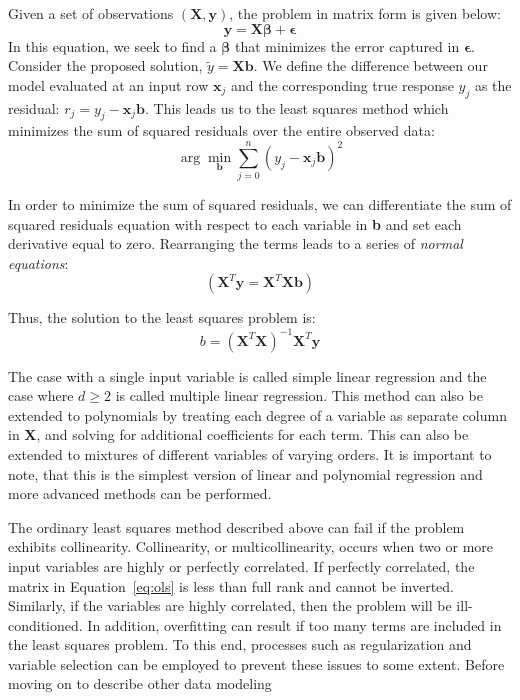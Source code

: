 Given a set of observations $(\textbf{X},\textbf{y})$, the problem in matrix form is given below:
%
\begin{equation}
\textbf{y} = \textbf{X}\boldsymbol\beta + \boldsymbol\epsilon
\end{equation}
%
In this equation, we seek to find a $\boldsymbol\beta$ that minimizes the error captured in $\boldsymbol\epsilon$.
%
Consider the proposed solution, $\tilde{y} = \textbf{X}\textbf{b}$.
%
We define the difference between our model evaluated at an input row $\textbf{x}_j$ and the corresponding true response $y_j$ as the residual: $r_j = y_j - \textbf{x}_j\textbf{b}$.
%
This leads us to the least squares method which minimizes the sum of squared residuals over the entire observed data:
\begin{equation}
\arg\min_{\textbf{b}} \sum_{j=0}^n(y_j - \textbf{x}_j\textbf{b})^2
\end{equation}

In order to minimize the sum of squared residuals, we can differentiate the sum of squared residuals equation with respect to each variable in \textbf{b} and set each derivative equal to zero.
%
Rearranging the terms leads to a series of \emph{normal equations}:
\begin{equation}
(\textbf{X}^T\textbf{y}= \textbf{X}^T\textbf{X}\textbf{b})
\end{equation}

Thus, the solution to the least squares problem is:
\begin{equation}
b = (\textbf{X}^T \textbf{X})^{-1} \textbf{X}^T \textbf{y}
\label{eq:ols}
\end{equation}

The case with a single input variable is called simple linear regression and the case where $d\geq 2$ is called multiple linear regression.
%
This method can also be extended to polynomials by treating each degree of a variable as separate column in \textbf{X}, and solving for additional coefficients for each term.
%
This can also be extended to mixtures of different variables of varying orders.
%
It is important to note, that this is the simplest version of linear and polynomial regression and more advanced methods can be performed.

The ordinary least squares method described above can fail if the problem exhibits collinearity.
%
Collinearity, or multicollinearity, occurs when two or more input variables are highly or perfectly correlated.
%
If perfectly correlated, the matrix in Equation~\ref{eq:ols} is less than full rank and cannot be inverted.
%
Similarly, if the variables are highly correlated, then the problem will be ill-conditioned.
%
In addition, overfitting can result if too many terms are included in the least squares problem.
%
To this end, processes such as regularization and variable selection can be employed to prevent these issues to some extent.
%
Before moving on to describe other data modeling

